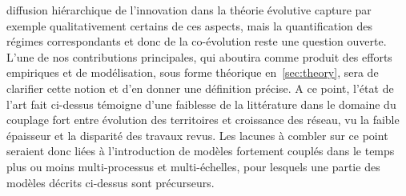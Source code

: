 diffusion hiérarchique de l'innovation dans la théorie évolutive capture par exemple qualitativement certains de ces aspects, mais la quantification des régimes correspondants et donc de la co-évolution reste une question ouverte. L'une de nos contributions principales, qui aboutira comme produit des efforts empiriques et de modélisation, sous forme théorique en~\ref{sec:theory}, sera de clarifier cette notion et d'en donner une définition précise. A ce point, l'état de l'art fait ci-dessus témoigne d'une faiblesse de la littérature dans le domaine du couplage fort entre évolution des territoires et croissance des réseau, vu la faible épaisseur et la disparité des travaux revus. Les lacunes à combler sur ce point seraient donc liées à l'introduction de modèles fortement couplés dans le temps plus ou moins multi-processus et multi-échelles, pour lesquels une partie des modèles décrits ci-dessus sont précurseurs.





\stars








